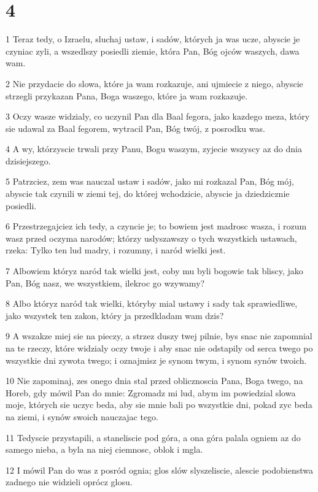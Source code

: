 \chapter{4}

\par 1 Teraz tedy, o Izraelu, sluchaj ustaw, i sadów, których ja was ucze, abyscie je czyniac zyli, a wszedlszy posiedli ziemie, która Pan, Bóg ojców waszych, dawa wam.
\par 2 Nie przydacie do slowa, które ja wam rozkazuje, ani ujmiecie z niego, abyscie strzegli przykazan Pana, Boga waszego, które ja wam rozkazuje.
\par 3 Oczy wasze widzialy, co uczynil Pan dla Baal fegora, jako kazdego meza, który sie udawal za Baal fegorem, wytracil Pan, Bóg twój, z posrodku was.
\par 4 A wy, którzyscie trwali przy Panu, Bogu waszym, zyjecie wszyscy az do dnia dzisiejszego.
\par 5 Patrzciez, zem was nauczal ustaw i sadów, jako mi rozkazal Pan, Bóg mój, abyscie tak czynili w ziemi tej, do której wchodzicie, abyscie ja dziedzicznie posiedli.
\par 6 Przestrzegajciez ich tedy, a czyncie je; to bowiem jest madrosc wasza, i rozum wasz przed oczyma narodów; którzy uslyszawszy o tych wszystkich ustawach, rzeka: Tylko ten lud madry, i rozumny, i naród wielki jest.
\par 7 Albowiem któryz naród tak wielki jest, coby mu byli bogowie tak bliscy, jako Pan, Bóg nasz, we wszystkiem, ilekroc go wzywamy?
\par 8 Albo któryz naród tak wielki, któryby mial ustawy i sady tak sprawiedliwe, jako wszystek ten zakon, który ja przedkladam wam dzis?
\par 9 A wszakze miej sie na pieczy, a strzez duszy twej pilnie, bys snac nie zapomnial na te rzeczy, które widzialy oczy twoje i aby snac nie odstapily od serca twego po wszystkie dni zywota twego; i oznajmisz je synom twym, i synom synów twoich.
\par 10 Nie zapominaj, zes onego dnia stal przed oblicznoscia Pana, Boga twego, na Horeb, gdy mówil Pan do mnie: Zgromadz mi lud, abym im powiedzial slowa moje, których sie uczyc beda, aby sie mnie bali po wszystkie dni, pokad zyc beda na ziemi, i synów swoich nauczajac tego.
\par 11 Tedyscie przystapili, a staneliscie pod góra, a ona góra palala ogniem az do samego nieba, a byla na niej ciemnosc, oblok i mgla.
\par 12 I mówil Pan do was z posród ognia; glos slów slyszeliscie, alescie podobienstwa zadnego nie widzieli oprócz glosu.
